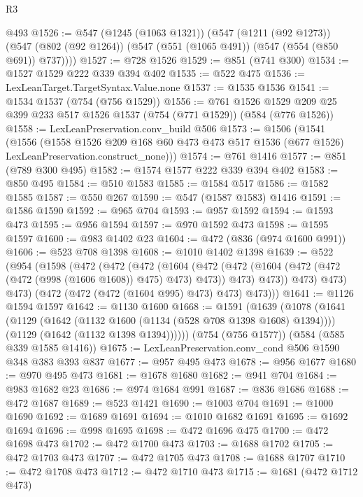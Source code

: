 \begin{lexlean}{R3}
\begin{coremodule}
    @493
@1526 := @547
    (@1245 (@1063 @1321))
    (@547
      (@1211 (@92 @1273))
      (@547 (@802 (@92 @1264)) (@547 (@551 (@1065 @491)) (@547 (@554 (@850 @691)) @737))))
@1527 := @728 @1526
@1529 := @851 (@741 @300)
@1534 := @1527 @1529 @222 @339 @394 @402
@1535 := @522 @475
@1536 := LexLeanTarget.TargetSyntax.Value.none
@1537 := @1535 @1536
@1541 := @1534 @1537 (@754 (@756 @1529))
@1556 := @761
    @1526
    @1529
    @209
    @25
    @399
    @233
    @517
    @1526
    @1537
    (@754 (@771 @1529))
    (@584 (@776 @1526))
@1558 := LexLeanPreservation.conv_build @506
@1573 := @1506
    (@1541
      (@1556
        (@1558
          @1526
          @209
          @168
          @60
          @473
          @473
          @517
          @1536
          (@677 @1526)
          LexLeanPreservation.construct_none)))
@1574 := @761 @1416
@1577 := @851 (@789 @300 @495)
@1582 := @1574 @1577 @222 @339 @394 @402
@1583 := @850 @495
@1584 := @510 @1583
@1585 := @1584 @517
@1586 := @1582 @1585
@1587 := @550 @267
@1590 := @547 (@1587 @1583) @1416
@1591 := @1586 @1590
@1592 := @965 @704
@1593 := @957 @1592
@1594 := @1593 @473
@1595 := @956 @1594
@1597 := @970 @1592 @473
@1598 := @1595 @1597
@1600 := @983 @1402 @23
@1604 := @472 (@836 (@974 @1600 @991))
@1606 := @523 @708 @1398
@1608 := @1010 @1402 @1398
@1639 := @522
    (@954
      (@1598
        (@472
          (@472
            (@472
              (@1604
                (@472
                  (@472 (@1604 (@472 (@472 (@472 (@998 (@1606 @1608)) @475) @473) @473)) @473)
                  @473))
              @473)
            @473)
          @473)
        (@472 (@472 (@472 (@1604 @995) @473) @473) @473)))
@1641 := @1126 @1594 @1597
@1642 := @1130 @1600
@1668 := @1591
    (@1639
      (@1078
        (@1641
          (@1129 (@1642 (@1132 @1600 (@1134 (@528 @708 @1398 @1608) @1394))))
          (@1129 (@1642 (@1132 @1398 @1394))))))
    (@754 (@756 @1577))
    (@584 (@585 @339 @1585 @1416))
@1675 := LexLeanPreservation.conv_cond @506 @1590 @348 @383 @393 @837
@1677 := @957 @495 @473
@1678 := @956 @1677
@1680 := @970 @495 @473
@1681 := @1678 @1680
@1682 := @941 @704
@1684 := @983 @1682 @23
@1686 := @974 @1684 @991
@1687 := @836 @1686
@1688 := @472 @1687
@1689 := @523 @1421
@1690 := @1003 @704
@1691 := @1000 @1690
@1692 := @1689 @1691
@1694 := @1010 @1682 @1691
@1695 := @1692 @1694
@1696 := @998 @1695
@1698 := @472 @1696 @475
@1700 := @472 @1698 @473
@1702 := @472 @1700 @473
@1703 := @1688 @1702
@1705 := @472 @1703 @473
@1707 := @472 @1705 @473
@1708 := @1688 @1707
@1710 := @472 @1708 @473
@1712 := @472 @1710 @473
@1715 := @1681 (@472 @1712 @473)

\end{coremodule}
\end{lexlean}

